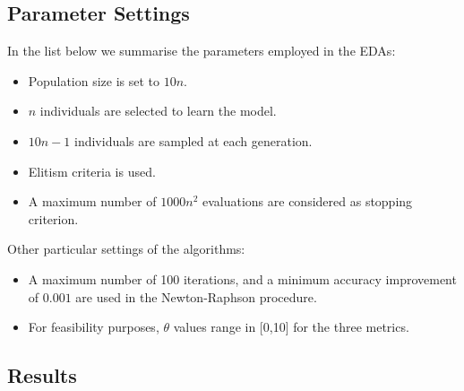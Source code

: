 \documentclass[conference]{IEEEtran}
\begin{document}
\subsection{Parameter Settings}
In the list below we summarise the parameters employed in the EDAs:
\begin{itemize}
\item Population size is set to $10n$.
\item $n$ individuals are selected to learn the model.
\item $10n-1$ individuals are sampled at each generation.
\item Elitism criteria is used.
\item A maximum number of $1000n^2$ evaluations are considered as stopping criterion.
\end{itemize}

Other particular settings of the algorithms:
\begin{itemize}
\item A maximum number of 100 iterations, and a minimum accuracy improvement of $0.001$ are used in the Newton-Raphson procedure.
\item For feasibility purposes, $\theta$ values range in [0,10] for the three metrics.
\end{itemize}

\subsection{Results}
\end{document}
